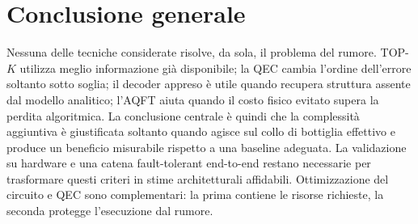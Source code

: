 \label{tab:finale_6_2}

\section{Conclusione generale}\label{sec:finale_6_5}

Nessuna delle tecniche considerate risolve, da sola, il problema del rumore. TOP-$K$ utilizza meglio informazione già disponibile; la QEC cambia l'ordine dell'errore soltanto sotto soglia; il decoder appreso è utile quando recupera struttura assente dal modello analitico; l'AQFT aiuta quando il costo fisico evitato supera la perdita algoritmica. La conclusione centrale è quindi che la complessità aggiuntiva è giustificata soltanto quando agisce sul collo di bottiglia effettivo e produce un beneficio misurabile rispetto a una baseline adeguata. La validazione su hardware e una catena fault-tolerant end-to-end restano necessarie per trasformare questi criteri in stime architetturali affidabili. Ottimizzazione del circuito e QEC sono complementari: la prima contiene le risorse richieste, la seconda protegge l'esecuzione dal rumore.
